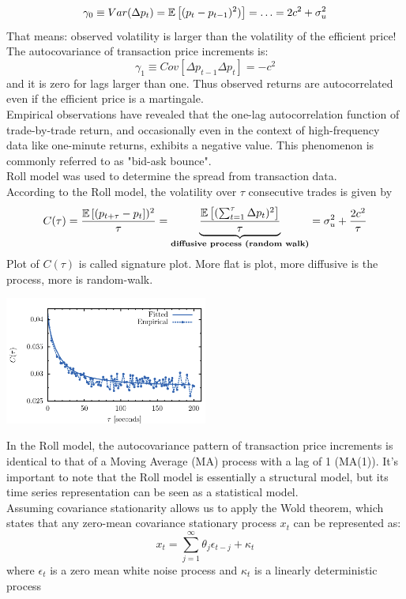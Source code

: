 \[
\gamma_0 \equiv Var(\Delta p_t) = \mathbb{E}\left[(p_t - p_{t-1})^2)\right] = \ldots = 2c^2 + \sigma_u^2
\]
That means: observed volatility is larger than the volatility of the efficient price!\\
The autocovariance of transaction price increments is:
\[
\gamma_1 \equiv Cov[\Delta p_{t-1} \Delta p_t] = -c^2
\]
and it is zero for lags larger than one. Thus observed returns are autocorrelated even if the efficient price is a martingale.\\
Empirical observations have revealed that the one-lag autocorrelation function of trade-by-trade return, and occasionally even in the context of high-frequency data like one-minute returns, exhibits a negative value. This phenomenon is commonly referred to as "bid-ask bounce".\\
Roll model was used to determine the spread from transaction data.\medskip \\
According to the Roll model, the volatility over $\tau$ consecutive trades is given by
\[
C(\tau) = \frac{\mathbb{E}\left[(p_{t+\tau} - p_t\right])^2}{\tau} = \underbrace{\frac{\mathbb{E}\left[(\sum_{t = 1}^{\tau} \Delta p_t)^2\right]}{\tau}}_{\textbf{diffusive process (random walk)}} = \sigma^2_u + \frac{2c^2}{\tau}
\]
Plot of $C(\tau)$ is called signature plot. More flat is plot, more diffusive is the process, more is random-walk.
\begin{center}
	\includegraphics[width=0.5\textwidth]{picture/(2)signature_plot.png}
\end{center}
In the Roll model, the autocovariance pattern of transaction price increments is identical to that of a Moving Average (MA) process with a lag of 1 (MA(1)). It's important to note that the Roll model is essentially a structural model, but its time series representation can be seen as a statistical model.\\
\newpage
Assuming covariance stationarity allows us to apply the Wold theorem, which states that any zero-mean covariance stationary process $x_t$ can be represented as:
\[
x_t = \sum_{j=1}^{\infty} \theta_j\epsilon_{t-j} + \kappa_t
\]
where $\epsilon_t$ is a zero mean white noise process and $\kappa_t$ is a linearly deterministic process
